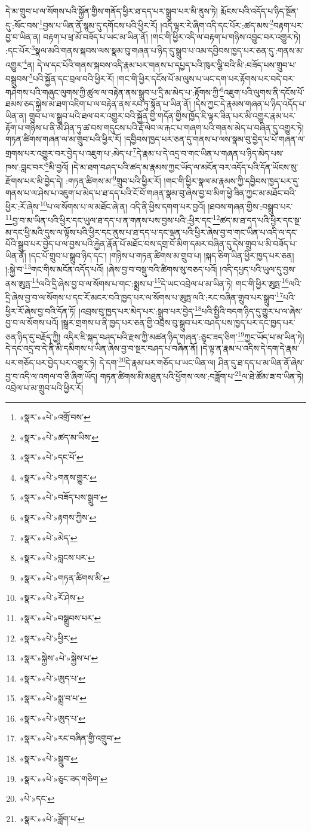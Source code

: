 དེ་མ་གྲུབ་པ་ལ་སོགས་པའི་སྐྱོན་གྱིས་གནོད་ཕྱིར་ཐ་དད་པར་སྒྲུབ་པར་མི་ནུས་ཏེ། རྨོངས་པའི་འདོད་པ་ཉིད་སྔོན་དུ་:སོང་བས་\footnote{«སྣར་»«པེ་»འགྲོ་བས་}བྱས་པ་ཡིན་ནོ་སྙམ་དུ་དགོངས་པའི་ཕྱིར་རོ། །འདི་ལྟར་རེ་ཞིག་འདི་དང་པོར་:ཚད་མས་\footnote{«སྣར་»«པེ་»ཚད་མ་ཡིས་}བརྟག་པར་བྱ་བ་ཡིན་ན། བརྟག་པ་ཕྲ་མོ་བཟོད་པ་ཡང་མ་ཡིན་ནོ། །གང་གི་ཕྱིར་འདི་ལ་བརྟག་པ་གཉིས་འབྱུང་བར་འགྱུར་ཏེ། :དང་པོར་\footnote{«སྣར་»«པེ་»དང་པོ་}སྣལ་མའི་གནས་སྐབས་ལས་སྣམ་བུ་གཞན་པ་ཉིད་དུ་སྒྲུབ་པ་འམ་དབྱིབས་ཁྱད་པར་ཅན་དུ་:གནས་མ་འགྱུར་\footnote{«སྣར་»«པེ་»གནས་གྱུར་}ན། དེ་ལ་དང་པོའི་གནས་སྐབས་འདི་རྣམ་པར་གནས་པ་དཔྱད་པའི་ཁུར་ལྕི་བའི་མི་:བཟོད་པས་གྲུབ་པ་བསྒྲུབས་\footnote{«སྣར་»«པེ་»བཟོད་པས་སྒྲུབ་}པའི་སྐྱོན་དང་བྲལ་བའི་ཕྱིར་རོ། །གང་གི་ཕྱིར་དངོས་པོ་མ་ལུས་པ་ཡང་དག་པར་རྟོགས་པར་བདེ་བར་གཤེགས་པའི་གཞུང་ལུགས་ཀྱི་ཚུལ་ལ་བརྟེན་ནས་སྒྲུབ་པ་དྲི་མ་མེད་པ་:རྟོགས་ཀྱི་\footnote{«སྣར་»«པེ་»རྟགས་ཀྱིས་}འཇུག་པའི་ལུགས་ནི་དངོས་པོ་ཐམས་ཅད་སྐྱེས་མ་ཐག་འཇིག་པ་ལ་བརྟེན་ནས་རབ་ཏུ་སྟོན་པ་ཡིན་ནོ། །དེས་ཀྱང་དེ་རྣམས་གཞན་པ་ཉིད་འདོད་པ་ཡིན་ན། གྲུབ་པ་ལ་སྒྲུབ་པའི་ཐལ་བར་འགྱུར་བའི་སྐྱོན་གྱི་གདོན་གྱིས་ཁྱོད་ཇི་ལྟར་ཟིན་པར་མི་འགྱུར་རྣམ་པར་རྟོག་པ་གཉིས་པ་ནི་མེ་ཤིན་ཏུ་ཚ་བས་གདུངས་པའི་རྡོ་ལེབ་ལ་རྐང་པ་གཞག་པའི་གནས་མེད་པ་བཞིན་དུ་འགྱུར་ཏེ། གཏན་ཚིགས་གཞན་ལ་མ་གྲུབ་པའི་ཕྱིར་རོ། །དབྱིབས་ཁྱད་པར་ཅན་དུ་གནས་པ་ལས་སྣམ་བུ་བྱེད་པ་པོ་གཞན་ལ་གྲགས་པར་འགྱུར་བར་བྱེད་པ་འཇུག་པ་:མེད་པ་\footnote{«སྣར་»«པེ་»མེད་}དེ་རྣམ་པ་དེ་འདྲ་བ་གང་ཡིན་པ་གཞན་པ་ཉིད་མེད་པས་ཁས་:བླང་བར་\footnote{«སྣར་»«པེ་»བླངས་པར་}མི་བྱའོ། །དེ་མ་ཐག་བཤད་པའི་ཚད་མ་རྣམས་ཀྱང་ཡོད་ལ་མངོན་བར་འདོད་པའི་དོན་ཡོངས་སུ་རྫོགས་པར་མི་བྱེད་དེ། :གཏན་ཚིགས་མ་\footnote{«སྣར་»«པེ་»གཏན་ཚིགས་མི་}གྲུབ་པའི་ཕྱིར་རོ། །གང་གི་ཕྱིར་སྣལ་མ་རྣམས་ཀྱི་དབྱིབས་ཁྱད་པར་དུ་གནས་པ་ལ་ཤེས་པ་འཇུག་པ་མེད་པ་ཐ་དད་པའི་ངོ་བོ་གཞན་སྣམ་བུ་ཞེས་བྱ་བ་མིག་ཕྱེ་ཟིན་ཀྱང་མ་མཐོང་བའི་ཕྱིར་:རོ་ཞེས་\footnote{«སྣར་»«པེ་»རོ་ཤེས་}པ་ལ་སོགས་པ་ལ་མཐོང་ཞེ་ན། འདི་ནི་ཕྱིས་དགག་པར་བྱའོ། །ཐབས་གཞན་གྱིས་:བསྒྲུབ་པར་\footnote{«སྣར་»«པེ་»བསྒྲུབས་པར་}བྱ་བ་མ་ཡིན་པའི་ཕྱིར་དང་ཡུལ་ཐ་དད་པ་ན་གནས་པས་བྱས་པའི་:ཕྱིར་དང་\footnote{«སྣར་»«པེ་»ཕྱིར་}ཚད་མ་ཐ་དད་པའི་ཕྱིར་དང་སྔ་མ་དང་ཕྱི་མའི་དུས་ལ་ལྟོས་པའི་ཕྱིར་དང་ནུས་པ་ཐ་དད་པ་དང་ལྡན་པའི་ཕྱིར་ཞེས་བྱ་བ་གང་ཡིན་པ་འདི་ལ་དང་པོའི་སྒྲུབ་པར་བྱེད་པ་ལ་བྱས་པའི་རྐྱེན་རྣོན་པོ་མཐོང་བས་དགྲ་བོ་མིག་དམར་བཞིན་དུ་དེས་གྲུབ་པ་མི་བཟོད་པ་ཡིན་ནོ། །དང་པོ་གྲུབ་པ་སྒྲུབ་ཉིད་དང་། །གཉིས་པ་གཏན་ཚིགས་མ་གྲུབ་པ། །སྐད་ཅིག་ཡིན་ཕྱིར་ཁྱད་པར་ཅན། །:སྐྱེ་བ་\footnote{«སྣར་»སྐྱེས་«པེ་»སྐྱེས་པ་}གང་གིས་མངོན་འདོད་པའོ། །ཞེས་བྱ་བ་བསྡུ་བའི་ཚིགས་སུ་བཅད་པའོ། །འདི་དཔྱད་པའི་ཡུལ་དུ་བྱས་ནས་ཨུཏྤ་\footnote{«སྣར་»«པེ་»ཨུད་པ་}ལའི་དྲི་ཞེས་བྱ་བ་ལ་སོགས་པ་གང་:སྨྲས་པ་\footnote{«སྣར་»«པེ་»སྨྲ་བ་པ་}དེ་ཡང་འབྲེལ་པ་མ་ཡིན་ཏེ། གང་གི་ཕྱིར་ཨུཏྤ་\footnote{«སྣར་»«པེ་»ཨུད་པ་}ལའི་དྲི་ཞེས་བྱ་བ་ལ་སོགས་པ་དང་རོ་མངར་བའི་ཁྱད་པར་ལ་སོགས་པ་ཨུཏྤ་ལའི་:རང་བཞིན་གྲུབ་པར་སྒྲུབ་\footnote{«སྣར་»«པེ་»རང་བཞིན་གྱི་འགྲུབ་}པའི་ཕྱིར་རོ་ཞེས་བྱ་བའི་དོན་ཏོ། །འབྲས་བུ་ཁྱད་པར་མེད་པར་:སྒྲུབ་པར་བྱེད་\footnote{«སྣར་»«པེ་»སྒྲུབ་}པའི་སྤྱིའི་བདག་ཉིད་དུ་གྱུར་པ་ལ་ཞེས་བྱ་བ་ལ་སོགས་པའོ། །སྒྲར་གྲགས་པ་ནི་ཁྱད་པར་ཅན་གྱི་འབྲས་བུ་སྒྲུབ་པར་བཤད་པས་ཁྱད་པར་དང་ཁྱད་པར་ཅན་ཉིད་དུ་བརྗོད་ཀྱི། འདིར་ཇི་སྐད་བཤད་པའི་རྫས་ཀྱི་མཚན་ཉིད་གཞན་:ཅུང་ཟད་ཅིག་\footnote{«སྣར་»«པེ་»ཅུང་ཟད་གཅིག་}ཀྱང་ཡོད་པ་མ་ཡིན་ཏེ། དེ་དང་འདྲ་བ་དེ་ནི་མི་དམིགས་པ་ཡིན་ཞེས་བྱ་བ་སྔར་བཤད་པ་བཞིན་ནོ། །དེ་ལྟ་ན་རྣམ་པ་འདིས་དེ་དག་དེ་རྣམ་པར་གཅོད་པར་བྱེད་པར་འགྱུར་ཏེ། དེ་དག་\footnote{«པེ་»དང་}དེ་རྣམ་པར་གཅོད་པ་ཡང་ཡིན་ལ། ཤིན་དུ་ཐ་དད་པ་མ་ཡིན་ནོ་ཞེས་བྱ་བ་འདི་ལ་འགལ་བ་ཅི་ཞིག་ཡོད། གཏན་ཚིགས་མི་མཐུན་པའི་ཕྱོགས་ལས་:བཟློག་པ་\footnote{«སྣར་»«པེ་»ཟློག་པ་}ལ་ཐེ་ཚོམ་ཟ་བ་ཡིན་ཏེ། འབྲེལ་པ་མ་གྲུབ་པའི་ཕྱིར་རོ། 